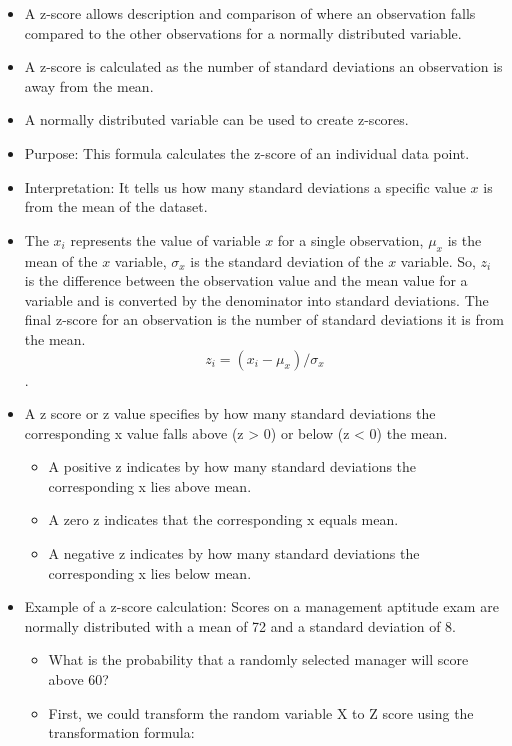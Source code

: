 \documentclass[
  letterpaper,
  DIV=11,
  numbers=noendperiod]{scrreprt}
\providecommand{\tightlist}{%
  \setlength{\itemsep}{0pt}\setlength{\parskip}{0pt}}\usepackage{longtable,booktabs,array}
\begin{document}
\begin{itemize}
\item
  A z-score allows description and comparison of where an observation
  falls compared to the other observations for a normally distributed
  variable.
\item
  A z-score is calculated as the number of standard deviations an
  observation is away from the mean.
\item
  A normally distributed variable can be used to create z-scores.
\item
  Purpose: This formula calculates the z-score of an individual data
  point.
\item
  Interpretation: It tells us how many standard deviations a specific
  value \(x\) is from the mean of the dataset.
\item
  The \(x_i\) represents the value of variable \(x\) for a single
  observation, \(\mu_x\) is the mean of the \(x\) variable, \(\sigma_x\)
  is the standard deviation of the \(x\) variable. So, \(z_i\) is the
  difference between the observation value and the mean value for a
  variable and is converted by the denominator into standard deviations.
  The final z-score for an observation is the number of standard
  deviations it is from the mean. \[z_i = (x_i - \mu_x)/\sigma_x\].
\item
  A z score or z value specifies by how many standard deviations the
  corresponding x value falls above (z \textgreater{} 0) or below (z
  \textless{} 0) the mean.

  \begin{itemize}
  \tightlist
  \item
    A positive z indicates by how many standard deviations the
    corresponding x lies above mean.
  \item
    A zero z indicates that the corresponding x equals mean.
  \item
    A negative z indicates by how many standard deviations the
    corresponding x lies below mean.
  \end{itemize}
\item
  Example of a z-score calculation: Scores on a management aptitude exam
  are normally distributed with a mean of 72 and a standard deviation of
  8.

  \begin{itemize}
  \tightlist
  \item
    What is the probability that a randomly selected manager will score
    above 60?
  \item
    First, we could transform the random variable X to Z score using the
    transformation formula:
  \end{itemize}
\end{itemize}
\end{document}
